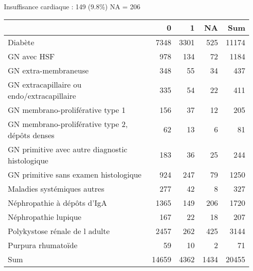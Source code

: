 \documentclass[11pt,a4paper]{article}\usepackage[]{graphicx}\usepackage[]{color}
\begin{document}
Insuffisance cardiaque : 149 (9.8\%) NA = 206

\begin{table}[H]
\centering
\begin{tabular}{lrrrr}
  \hline
 & 0 & 1 & NA & Sum \\ 
  \hline
Diabète & 7348 & 3301 & 525 & 11174 \\ 
  GN avec HSF & 978 & 134 & 72 & 1184 \\ 
  GN extra-membraneuse & 348 & 55 & 34 & 437 \\ 
  GN extracapillaire ou endo/extracapillaire & 335 & 54 & 22 & 411 \\ 
  GN membrano-proliférative type 1 & 156 & 37 & 12 & 205 \\ 
  GN membrano-proliférative type 2, dépôts denses & 62 & 13 & 6 & 81 \\ 
  GN primitive avec autre diagnostic histologique & 183 & 36 & 25 & 244 \\ 
  GN primitive sans examen histologique & 924 & 247 & 79 & 1250 \\ 
  Maladies systémiques autres & 277 & 42 & 8 & 327 \\ 
  Néphropathie à dépôts d'IgA & 1365 & 149 & 206 & 1720 \\ 
  Néphropathie lupique & 167 & 22 & 18 & 207 \\ 
  Polykystose rénale de l adulte & 2457 & 262 & 425 & 3144 \\ 
  Purpura rhumatoïde & 59 & 10 & 2 & 71 \\ 
  Sum & 14659 & 4362 & 1434 & 20455 \\ 
   \hline
\end{tabular}
\end{table}
\end{document}
